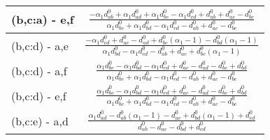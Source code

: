 \documentclass[12pt]{article}
\begin{document}
\begin{longtable}{l|c}
(b,c:a) - e,f& {$\displaystyle \frac{- \alpha_{1} d^{\scriptscriptstyle 0}_{ab} + \alpha_{1} d^{\scriptscriptstyle 0}_{ad} + \alpha_{1} d^{\scriptscriptstyle 0}_{bc} - \alpha_{1} d^{\scriptscriptstyle 0}_{cd} + d^{\scriptscriptstyle 0}_{ab} + d^{\scriptscriptstyle 0}_{ac} - d^{\scriptscriptstyle 0}_{bc}}{\alpha_{1} d^{\scriptscriptstyle 0}_{bc} + \alpha_{1} d^{\scriptscriptstyle 0}_{bd} - \alpha_{1} d^{\scriptscriptstyle 0}_{cd} - d^{\scriptscriptstyle 0}_{ab} + d^{\scriptscriptstyle 0}_{ac} - d^{\scriptscriptstyle 0}_{bc}} $}\\[0.4cm]\hline 
(b,c:d) - a,e& {$\displaystyle \frac{- \alpha_{1} d^{\scriptscriptstyle 0}_{cd} + d^{\scriptscriptstyle 0}_{ac} - d^{\scriptscriptstyle 0}_{ad} + d^{\scriptscriptstyle 0}_{bc} \left(\alpha_{1} - 1\right) - d^{\scriptscriptstyle 0}_{bd} \left(\alpha_{1} - 1\right)}{\alpha_{1} d^{\scriptscriptstyle 0}_{bd} - \alpha_{1} d^{\scriptscriptstyle 0}_{cd} - d^{\scriptscriptstyle 0}_{ab} + d^{\scriptscriptstyle 0}_{ac} + d^{\scriptscriptstyle 0}_{bc} \left(\alpha_{1} - 1\right)} $}\\[0.4cm]\hline 
(b,c:d) - a,f& {$\displaystyle \frac{\alpha_{1} d^{\scriptscriptstyle 0}_{bc} - \alpha_{1} d^{\scriptscriptstyle 0}_{bd} - \alpha_{1} d^{\scriptscriptstyle 0}_{cd} + d^{\scriptscriptstyle 0}_{ac} - d^{\scriptscriptstyle 0}_{ad} - d^{\scriptscriptstyle 0}_{bc} + d^{\scriptscriptstyle 0}_{bd}}{\alpha_{1} d^{\scriptscriptstyle 0}_{bc} + \alpha_{1} d^{\scriptscriptstyle 0}_{bd} - \alpha_{1} d^{\scriptscriptstyle 0}_{cd} - d^{\scriptscriptstyle 0}_{ab} + d^{\scriptscriptstyle 0}_{ac} - d^{\scriptscriptstyle 0}_{bc}} $}\\[0.4cm]\hline 
(b,c:d) - e,f& {$\displaystyle \frac{\alpha_{1} d^{\scriptscriptstyle 0}_{bc} - \alpha_{1} d^{\scriptscriptstyle 0}_{bd} - \alpha_{1} d^{\scriptscriptstyle 0}_{cd} + d^{\scriptscriptstyle 0}_{ac} - d^{\scriptscriptstyle 0}_{ad} - d^{\scriptscriptstyle 0}_{bc} + d^{\scriptscriptstyle 0}_{bd}}{\alpha_{1} d^{\scriptscriptstyle 0}_{bc} + \alpha_{1} d^{\scriptscriptstyle 0}_{bd} - \alpha_{1} d^{\scriptscriptstyle 0}_{cd} - d^{\scriptscriptstyle 0}_{ab} + d^{\scriptscriptstyle 0}_{ac} - d^{\scriptscriptstyle 0}_{bc}} $}\\[0.4cm]\hline 
(b,c:e) - a,d& {$\displaystyle \frac{\alpha_{1} d^{\scriptscriptstyle 0}_{ad} - d^{\scriptscriptstyle 0}_{ab} \left(\alpha_{1} - 1\right) - d^{\scriptscriptstyle 0}_{ac} + d^{\scriptscriptstyle 0}_{bd} \left(\alpha_{1} - 1\right) + d^{\scriptscriptstyle 0}_{cd}}{d^{\scriptscriptstyle 0}_{ab} - d^{\scriptscriptstyle 0}_{ac} - d^{\scriptscriptstyle 0}_{bd} + d^{\scriptscriptstyle 0}_{cd}} $}\\[0.4cm]\hline 

\end{longtable}
\end{document}
